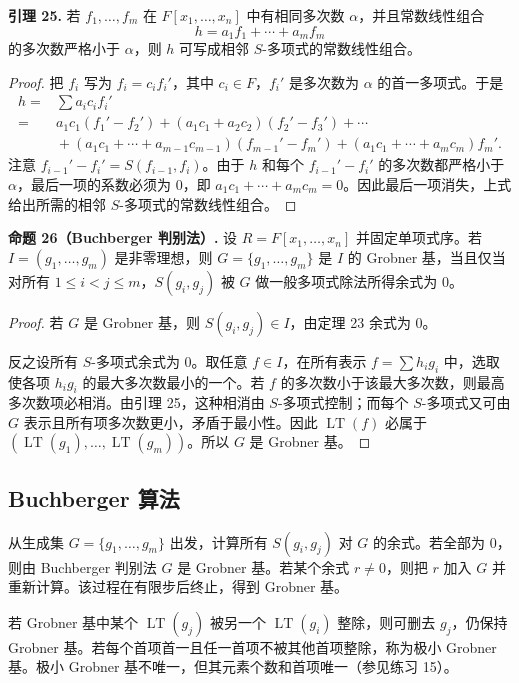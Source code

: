 \noindent\textbf{引理 25.} 若 $f_1,
\ldots,f_m$ 在 $F[x_1,\ldots,x_n]$ 中有相同多次数 $\alpha$，并且常数线性组合
\[
h=a_1f_1+\cdots+a_mf_m
\]
的多次数严格小于 $\alpha$，则 $h$ 可写成相邻 $S$-多项式的常数线性组合。

\begin{proof}
	把 $f_i$ 写为 $f_i=c_i f_i'$，其中 $c_i\in F$，$f_i'$ 是多次数为 $\alpha$ 的首一多项式。于是
\[
\begin{aligned}
h={}&\sum a_i c_i f_i' \\
={}& a_1c_1(f_1'-f_2')+(a_1c_1+a_2c_2)(f_2'-f_3')+\cdots \\
&{}+(a_1c_1+\cdots+a_{m-1}c_{m-1})(f_{m-1}'-f_m')
+(a_1c_1+\cdots+a_mc_m)f_m'.
\end{aligned}
\]
注意 $f_{i-1}'-f_i'=S(f_{i-1},f_i)$。由于 $h$ 和每个 $f_{i-1}'-f_i'$ 的多次数都严格小于 $\alpha$，最后一项的系数必须为 $0$，即 $a_1c_1+\cdots+a_mc_m=0$。因此最后一项消失，上式给出所需的相邻 $S$-多项式的常数线性组合。
\end{proof}

\noindent\textbf{命题 26（Buchberger 判别法）.} 设 $R=F[x_1,\ldots,x_n]$ 并固定单项式序。若 $I=(g_1,\ldots,g_m)$ 是非零理想，则 $G=\{g_1,\ldots,g_m\}$ 是 $I$ 的 Grobner 基，当且仅当对所有 $1\leq i<j\leq m$，$S(g_i,g_j)$ 被 $G$ 做一般多项式除法所得余式为 $0$。

\begin{proof}
	若 $G$ 是 Grobner 基，则 $S(g_i,g_j)\in I$，由定理 23 余式为 $0$。
	
	反之设所有 $S$-多项式余式为 $0$。取任意 $f\in I$，在所有表示 $f=\sum h_i g_i$ 中，选取使各项 $h_i g_i$ 的最大多次数最小的一个。若 $f$ 的多次数小于该最大多次数，则最高多次数项必相消。由引理 25，这种相消由 $S$-多项式控制；而每个 $S$-多项式又可由 $G$ 表示且所有项多次数更小，矛盾于最小性。因此 $\operatorname{LT}(f)$ 必属于 $(\operatorname{LT}(g_1),\ldots,\operatorname{LT}(g_m))$。所以 $G$ 是 Grobner 基。
\end{proof}

\subsection*{Buchberger 算法}
从生成集 $G=\{g_1,\ldots,g_m\}$ 出发，计算所有 $S(g_i,g_j)$ 对 $G$ 的余式。若全部为 $0$，则由 Buchberger 判别法 $G$ 是 Grobner 基。若某个余式 $r\neq0$，则把 $r$ 加入 $G$ 并重新计算。该过程在有限步后终止，得到 Grobner 基。

若 Grobner 基中某个 $\operatorname{LT}(g_j)$ 被另一个 $\operatorname{LT}(g_i)$ 整除，则可删去 $g_j$，仍保持 Grobner 基。若每个首项首一且任一首项不被其他首项整除，称为极小 Grobner 基。极小 Grobner 基不唯一，但其元素个数和首项唯一（参见练习 15）。

